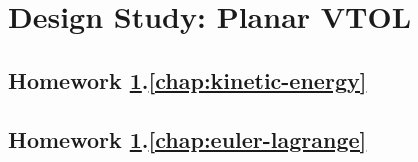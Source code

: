 
\chapter{Design Study: Planar VTOL}
\label{hw:vtol}




\vspace{.5cm}



\clearpage

	\section*{
		Homework \ref{hw:vtol}.\ref{chap:kinetic-energy}}  
		\label{hw:vtol_kinetic}
		
	\section*{
		Homework \ref{hw:vtol}.\ref{chap:euler-lagrange}}  
		\label{hw:vtol_equations_of_motion}
		
%		

